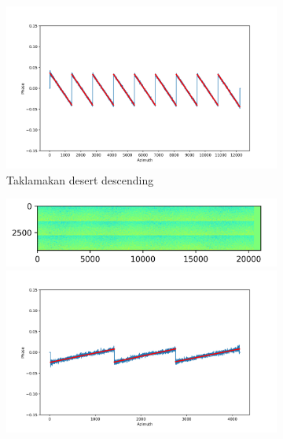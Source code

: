 \documentclass[a4paper,fleqn]{cas-sc}
\begin{document}
\begin{figure}
\begin{subfigure}[c]{0.5\textwidth}
\begin{minipage}[c]{0.5\textwidth}
        \end{minipage}%
        \begin{minipage}[c]{0.5\textwidth}
            \centering
            \includegraphics[width=\textwidth]{figure/The cross-interferogram/cross_interf_TaklimakanDesert_des_row&fitted_20230108.png}
        \end{minipage}
        \caption{Taklamakan desert descending}
        \label{fig_5b}
    \end{subfigure}%
    \hfill
    \begin{subfigure}{0.5\textwidth}
        \centering
        \begin{minipage}{0.5\textwidth}
            \centering
            \includegraphics[width=\textwidth]{figure/The cross-interferogram/cross_interf_Mexico_asc.png}
        \end{minipage}%
        \begin{minipage}{0.5\textwidth}
            \centering
            \includegraphics[width=\textwidth]{figure/The cross-interferogram/cross_interf_Mexico_asc_row&fitted_20230104.png}

\end{minipage}
\end{subfigure}
\end{figure}
\end{document}

